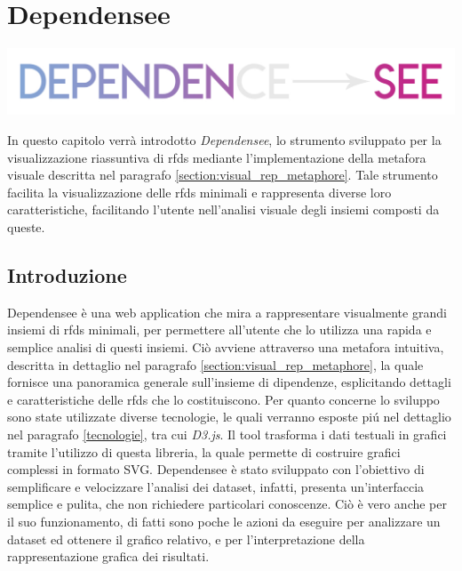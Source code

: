 \chapter{Dependensee}
\label{cap5:dependensee}
\begin{center}
    \includegraphics[width=.5\columnwidth]{capitoli/figure/logo_dependensee}
\end{center}

In questo capitolo verr\`{a} introdotto \textit{Dependensee}, lo strumento sviluppato per la visualizzazione riassuntiva di \acrlong{rfds} mediante l'implementazione della metafora visuale descritta nel paragrafo \ref{section:visual_rep_metaphore}. Tale strumento facilita la visualizzazione delle \acrlong{rfds} minimali e rappresenta diverse loro caratteristiche, facilitando l'utente nell'analisi visuale degli insiemi composti da queste.

\section{Introduzione} %
Dependensee \`{e} una web application che mira a rappresentare visualmente grandi insiemi di \acrlong{rfds} minimali, per permettere all'utente che lo utilizza una rapida e semplice analisi di questi insiemi. Ci\`{o} avviene attraverso una metafora intuitiva, descritta in dettaglio nel paragrafo \ref{section:visual_rep_metaphore}, la quale fornisce una panoramica generale sull'insieme di dipendenze, esplicitando dettagli e caratteristiche delle \acrlong{rfds} che lo costituiscono. Per quanto concerne lo sviluppo sono state utilizzate diverse tecnologie, le quali verranno esposte pi\'{u} nel dettaglio nel paragrafo \ref{tecnologie}, tra cui \textit{D3.js}. Il tool trasforma i dati testuali in grafici tramite l'utilizzo di questa libreria, la quale permette di costruire grafici complessi in formato SVG. Dependensee \`{e} stato sviluppato con l'obiettivo di semplificare e velocizzare l'analisi dei dataset, infatti, presenta un'interfaccia semplice e pulita, che non richiedere particolari conoscenze. Ci\`{o} \`{e} vero anche per il suo funzionamento, di fatti sono poche le azioni da eseguire per analizzare un dataset ed ottenere il grafico relativo, e per l'interpretazione della rappresentazione grafica dei risultati.

